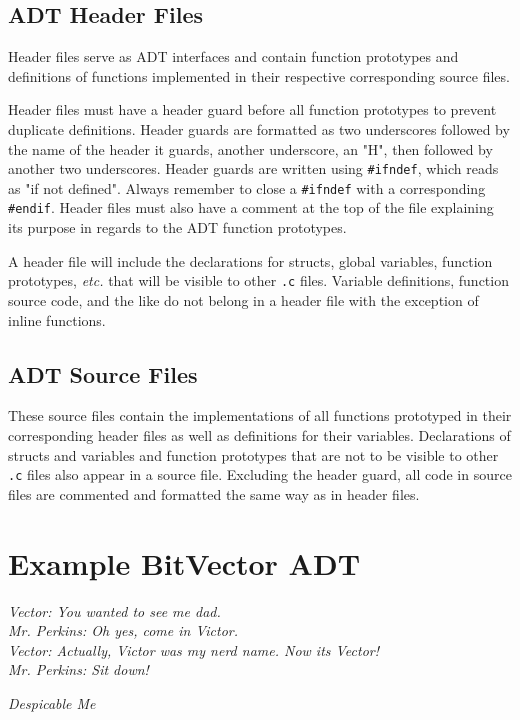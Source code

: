 \documentclass[11pt]{article}
\begin{document}
\subsection{ADT Header Files} \label{headers}
Header files serve as ADT interfaces and contain function prototypes and
definitions of functions implemented in their respective corresponding source
files.

Header files must have a header guard before all function prototypes to
prevent duplicate definitions. Header guards are formatted as two underscores
followed by the name of the header it guards, another underscore, an "H", then
followed by another two underscores. Header guards are written using
\texttt{\#ifndef}, which reads as "if not defined". Always remember to close a
\texttt{\#ifndef} with a corresponding \texttt{\#endif}. Header files must also
have a comment at the top of the file explaining its purpose in regards to the
ADT function prototypes.

A header file will include the declarations for structs, global variables,
function prototypes, \emph{etc.} that will be visible to other \texttt{.c}
files. Variable definitions, function source code, and the like do not belong
in a header file with the exception of inline functions.

\subsection{ADT Source Files}
These source files contain the implementations of all functions prototyped in
their corresponding header files as well as definitions for their variables.
Declarations of structs and variables and function prototypes that are not to be
visible to other \texttt{.c} files also appear in a source file.
Excluding the header guard, all code in source files are commented and formatted
the same way as in header files.


\section{Example BitVector ADT}
\textwidth
\epigraph{\emph{
Vector: You wanted to see me dad. \\
Mr. Perkins: Oh yes, come in Victor. \\
Vector: Actually, Victor was my nerd name.  Now its Vector! \\
Mr. Perkins: Sit down!
}}{\emph{Despicable Me}}
\end{document}
